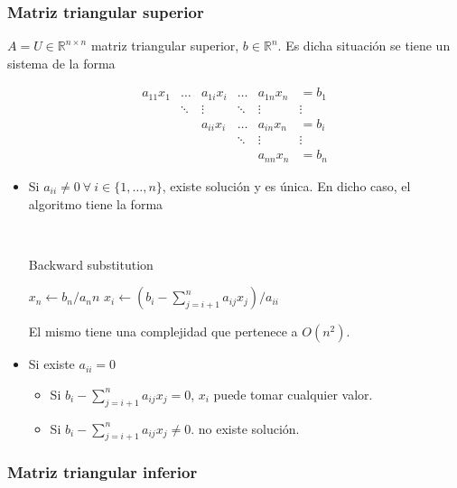 \subsubsection{Matriz triangular superior}\label{subsubsec:matriz_triangular_superior}

$A = U \in \mathbb{R}^{n \times n}$ matriz triangular superior, $b \in \mathbb{R}^{n}$. Es dicha situación se tiene un sistema de la forma

\[
\begin{matrix}
a_{11}x_{1} & \ldots & a_{1i}x_i & \ldots & a_{1n}x_n & = b_1 \\
 & \ddots & \vdots & \ddots & \vdots & \vdots \\
 & & a_{ii}x_{i} & \ldots & a_{in}x_n & = b_{i} \\
 & &  & \ddots & \vdots & \vdots \\
 & & & & a_{nn}x_n & = b_n
\end{matrix}
\]

\begin{itemize}
    \item Si $a_{ii} \neq 0 ~\forall~ i \in \{1,\ldots,n\}$, existe solución y es única. En dicho caso, el algoritmo tiene la forma
    
    \
    \begin{algorithm}
    \begin{algorithmic}
    \caption{Backward substitution}
    \label{alg:backward_substitution}
    \State $x_n \gets b_n/a_nn $
        \State $x_i \gets (b_i - \sum_{j=i+1}^{n} a_{ij}x_j)/a_{ii}$
    \EndFor
    \end{algorithmic}
    \end{algorithm}
    
    El mismo tiene una complejidad que pertenece a $O(n^2)$.
    
    \item Si existe $a_{ii} = 0$
    \begin{itemize}
        \item Si $b_{i} - \sum_{j=i+1}^{n} a_{ij}x_j = 0$, $x_i$ puede tomar cualquier valor.
        \item Si $b_{i} - \sum_{j=i+1}^{n} a_{ij}x_j \neq 0$. no existe solución.
    \end{itemize}
\end{itemize}

\subsubsection{Matriz triangular inferior}\label{subsubsec:matriz_triangular_inferior}

